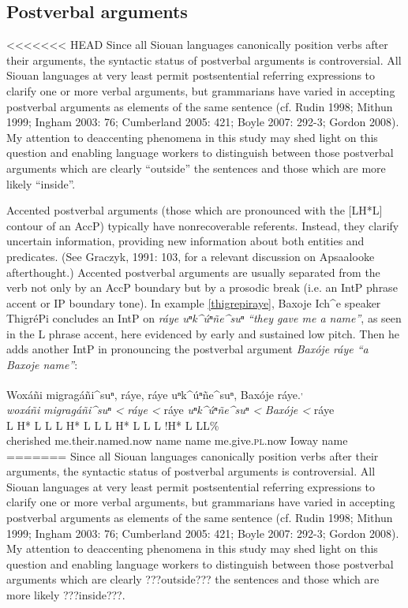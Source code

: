\documentclass[output=paper]{LSP/langsci}
\begin{document}
\subsection{Postverbal arguments}\label{postverbalarguments}

<<<<<<< HEAD
Since all Siouan languages canonically position verbs after their arguments, the syntactic status of postverbal arguments is controversial. All Siouan languages at very least permit postsentential referring expressions to clarify one or more verbal arguments, but grammarians have varied in accepting postverbal arguments as elements of the same sentence (cf. Rudin 1998; Mithun 1999; Ingham 2003: 76; Cumberland 2005: 421; Boyle 2007: 292-3; Gordon 2008). My attention to deaccenting phenomena in this study may shed light on this question and enabling language workers to distinguish between those postverbal arguments which are clearly “outside” the sentences and those which are more likely “inside”.

Accented postverbal arguments (those which are pronounced with the [LH*L] contour of an AccP) typically have nonrecoverable referents. Instead, they clarify uncertain information, providing new information about both entities and predicates. (See Graczyk, 1991: 103, for a relevant discussion on Apsaalooke afterthought.) Accented postverbal arguments are usually separated from the verb not only by an AccP boundary but by a prosodic break (i.e. an IntP phrase accent or IP boundary tone). In example \ref{thigrepiraye}, Baxoje Ich\^{}e speaker ThigréPi concludes an IntP on \emph{ráye uⁿk\^{}úⁿñe\^{}suⁿ “they gave me a name”}, as seen in the L phrase accent, here evidenced by early and sustained low pitch. Then he adds another IntP in pronouncing the postverbal argument \emph{Baxóje ráye “a Baxoje name”}:

\ea\label{thigrepiraye}
Woxáñi migragáñi\^{}suⁿ, ráye, ráye uⁿk\^{}úⁿñe\^{}suⁿ, Baxóje ráye.\footnotemark\textsuperscript{,} \footnotemark\\
\glll	\emph{woxáñi} 	\emph{migragáñi\^{}suⁿ <}		\emph{ráye <}	ráye		\emph{uⁿk\^{}úⁿñe\^{}suⁿ <}	\emph{Baxóje <}		ráye\\
	{\ob L H* L}		{L\cb}	{\ob L H* L L\cb}	{\ob L H* L}	{L\cb}	{\ob L !H* L} 		{L\cb{}L\%}\\
	cherished	me.their.named.now	name		name	me.give.\textsc{pl}.now	Ioway			name\\
=======
Since all Siouan languages canonically position verbs after their arguments, the syntactic status of postverbal arguments is controversial. All Siouan languages at very least permit postsentential referring expressions to clarify one or more verbal arguments, but grammarians have varied in accepting postverbal arguments as elements of the same sentence (cf. Rudin 1998; Mithun 1999; Ingham 2003: 76; Cumberland 2005: 421; Boyle 2007: 292-3; Gordon 2008). My attention to deaccenting phenomena in this study may shed light on this question and enabling language workers to distinguish between those postverbal arguments which are clearly ???outside??? the sentences and those which are more likely ???inside???.
\end{document}
